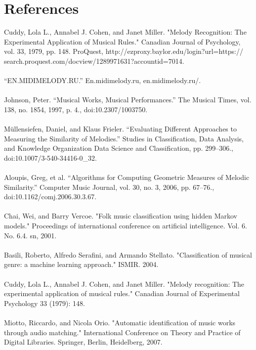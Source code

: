 \documentclass{article}
\begin{document}
	\section{References}
	Cuddy, Lola L., Annabel J. Cohen, and Janet Miller. "Melody Recognition: The Experimental Application of Musical Rules." 
	Canadian Journal of Psychology, vol. 33, 1979, pp. 148. ProQuest,
	http://ezproxy.baylor.edu/login?url=https://\\search.proquest.com/docview/1289971631?accountid=7014.
	\\ \\
	“EN.MIDIMELODY.RU.” En.midimelody.ru, en.midimelody.ru/.
	\\ \\
	Johnson, Peter. “Musical Works, Musical Performances.” The Musical Times, vol. 138, no. 1854, 1997, p. 4., doi:10.2307/1003750.
	\\ \\
	Müllensiefen, Daniel, and Klaus Frieler. “Evaluating Different Approaches to Measuring the Similarity of Melodies.” 
	Studies in Classification, Data Analysis, and Knowledge Organization Data Science and Classification, pp. 299–306., doi:10.1007/3-540-34416-0\_32.
	\\ \\
	Aloupis, Greg, et al. “Algorithms for Computing Geometric Measures of Melodic Similarity.” Computer Music Journal, vol. 30, no. 3, 2006, pp. 67–76., \\doi:10.1162/comj.2006.30.3.67.
	\\ \\
	Chai, Wei, and Barry Vercoe. "Folk music classification using hidden Markov models." Proceedings of international conference on 
	artificial intelligence. Vol. 6. No. 6.4. sn, 2001.
	\\ \\
	Basili, Roberto, Alfredo Serafini, and Armando Stellato. "Classification of musical genre: a machine learning approach." ISMIR. 2004.
	\\ \\
	Cuddy, Lola L., Annabel J. Cohen, and Janet Miller. "Melody recognition: The experimental application of musical rules." Canadian 
	Journal of Experimental Psychology 33 (1979): 148.
	\\ \\
	Miotto, Riccardo, and Nicola Orio. "Automatic identification of music works through audio matching." International Conference on 
	Theory and Practice of Digital Libraries. Springer, Berlin, Heidelberg, 2007.
	\\ \\
\end{document}
